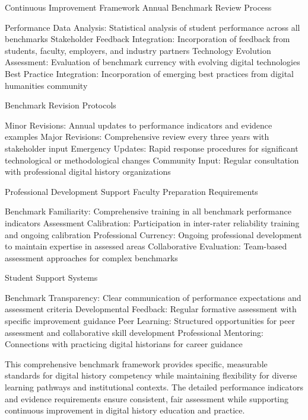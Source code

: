 \begin{appendices}
Continuous Improvement Framework
Annual Benchmark Review Process

Performance Data Analysis: Statistical analysis of student performance across all benchmarks
Stakeholder Feedback Integration: Incorporation of feedback from students, faculty, employers, and industry partners
Technology Evolution Assessment: Evaluation of benchmark currency with evolving digital technologies
Best Practice Integration: Incorporation of emerging best practices from digital humanities community

Benchmark Revision Protocols

Minor Revisions: Annual updates to performance indicators and evidence examples
Major Revisions: Comprehensive review every three years with stakeholder input
Emergency Updates: Rapid response procedures for significant technological or methodological changes
Community Input: Regular consultation with professional digital history organizations

Professional Development Support
Faculty Preparation Requirements

Benchmark Familiarity: Comprehensive training in all benchmark performance indicators
Assessment Calibration: Participation in inter-rater reliability training and ongoing calibration
Professional Currency: Ongoing professional development to maintain expertise in assessed areas
Collaborative Evaluation: Team-based assessment approaches for complex benchmarks

Student Support Systems

Benchmark Transparency: Clear communication of performance expectations and assessment criteria
Developmental Feedback: Regular formative assessment with specific improvement guidance
Peer Learning: Structured opportunities for peer assessment and collaborative skill development
Professional Mentoring: Connections with practicing digital historians for career guidance

This comprehensive benchmark framework provides specific, measurable standards for digital history competency while maintaining flexibility for diverse learning pathways and institutional contexts. The detailed performance indicators and evidence requirements ensure consistent, fair assessment while supporting continuous improvement in digital history education and practice.

\end{appendices}
